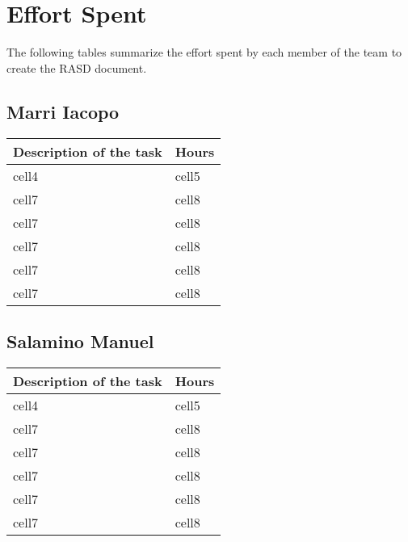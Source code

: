 \section{Effort Spent}
The following tables summarize the effort spent by each member of the team to create the RASD document.
\subsection{Marri Iacopo}
\begin{center}
\renewcommand{\arraystretch}{1.5}
\begin{tabular}{ |m{7cm}|m{2cm}| } 
 \hline
 \textbf{Description of the task}  & \textbf{Hours} \\
 \hline
 cell4 & cell5 \\
 \hline
 cell7 & cell8 \\ 
 \hline
  cell7 & cell8 \\ 
 \hline 
 cell7 & cell8 \\ 
 \hline
 cell7 & cell8 \\ 
 \hline
 cell7 & cell8 \\ 
 \hline
\end{tabular}
\end{center}


\subsection{Salamino Manuel}
\renewcommand{\arraystretch}{1.5}

\begin{center}
\begin{tabular}{ |m{7cm}|m{2cm}| } 
 \hline
 \textbf{Description of the task}  & \textbf{Hours} \\
 \hline
 cell4 & cell5 \\
 \hline
 cell7 & cell8 \\ 
 \hline
  cell7 & cell8 \\ 
 \hline 
 cell7 & cell8 \\ 
 \hline
 cell7 & cell8 \\ 
 \hline
 cell7 & cell8 \\ 
 \hline
\end{tabular}
\end{center}

